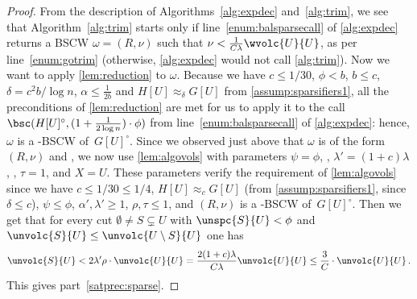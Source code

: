 \begin{proof}
	From the description of Algorithms~\ref{alg:expdec} and~\ref{alg:trim}, we see that Algorithm~\ref{alg:trim} starts only if line~\eqref{enum:balsparsecall} of \cref{alg:expdec} returns a BSCW $\omega=(R,\nu)$ such that $\nu < \frac{1}{C \lambda}\wvolc{U}{U}$, as per line~\eqref{enum:gotrim} (otherwise, \cref{alg:expdec} would not call \cref{alg:trim}). Now we want to apply \cref{lem:reduction} to $\omega$. Because we have $c\le 1/30$, $\phi < b$, $b \le c$, $\delta=c^2 b/\log n $, $\alpha \le \frac{1}{2b}$ and $H[U] \approx_{\delta} G[U]$ from \cref{assump:sparsifiers1}, all the preconditions of \cref{lem:reduction} are met for us to apply it to the call $\bsc(H[U]^\circ, (1+\frac{1}{2\log n}) \cdot \phi)$ from line~\eqref{enum:balsparsecall} of \cref{alg:expdec}: hence, $\omega$ is a  -BSCW of~$G[U]^\circ$. Since we observed just above that $\omega$ is of the form $(R,\nu)$ and , we now use \cref{lem:algovols} with parameters $\psi=\phi$, , $\lambda' =(1+c)\lambda$, , $\tau=1$, and $X=U$. These parameters verify the requirement of \cref{lem:algovols} since we have $ c\le 1/30 \le 1/4$, $H[U] \approx_{c} G[U]$ (from \cref{assump:sparsifiers1}, since $\delta \le c$), $\psi \le \phi$, $\alpha',\lambda' \ge 1$, $\rho,\tau \le 1$, and  $(R,\nu)$ is a -BSCW of~$G[U]^\circ$. Then we get that for every cut $\emptyset \neq  S \subsetneq U$ with $\unspc{S}{U} < \phi$ and $ \unvolc{S}{U} \le \unvolc{U \setminus S}{U}$ one has
	\begin{equation*}
		\unvolc{S}{U} < 2\lambda' \rho \cdot \unvolc{U}{U} = \frac{2(1+c)\lambda}{C\lambda}  \unvolc{U}{U} \leq \frac{3}{C} \cdot \unvolc{U}{U} \, .
	\end{equation*}
	This gives part~\eqref{satprec:sparse}.
	

\end{proof}
